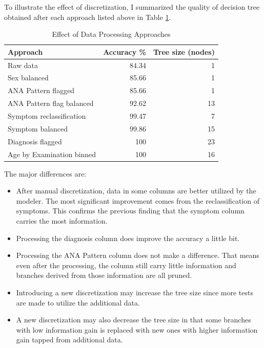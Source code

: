 \documentclass[12pt]{article}
\begin{document}
To illustrate the effect of discretization, I summarized the quality of decision tree obtained after each approach listed above in Table \ref{tbl:accuracy}.

\begin{table}[!ht]
\caption{\label{tbl:accuracy} Effect of Data Processing Approaches}
\begin{center}
\begin{tabular}{|l|r|r|}
\hline
        \textbf{Approach} & \textbf{Accuracy \%} & \textbf{Tree size (nodes)}\\
\hline
                 Raw data &             84.34 &                          1\\
\hline
             Sex balanced &             85.66 &                          1\\
\hline
      ANA Pattern flagged &             85.66 &                          1\\
\hline
ANA Pattern flag balanced &             92.62 &                         13\\
\hline
 Symptom reclassification &             99.47 &                          7\\
\hline
         Symptom balanced &             99.86 &                         15\\
\hline
        Diagnosis flagged &               100 &                         23\\
\hline
Age by Examination binned &               100 &                         16\\
\hline
\end{tabular}
\end{center}
\end{table}

The major differences are:
\begin{itemize}
	\item After manual discretization, data in some columns are better utilized by the modeler. The most significant improvement comes from the reclassification of symptoms. This confirms the previous finding that the symptom column carries the most information.
	\item Processing the diagnosis column does improve the accuracy a little bit.
	\item Processing the ANA Pattern column does not make a difference. That means even after the processing, the column still carry little information and branches derived from those information are all pruned.
	\item Introducing a new discretization may increase the tree size since more tests are made to utilize the additional data.
	\item A new discretization may also decrease the tree size in that some branches with low information gain is replaced with new ones with higher information gain tapped from additional data.
\end{itemize}
\end{document}

